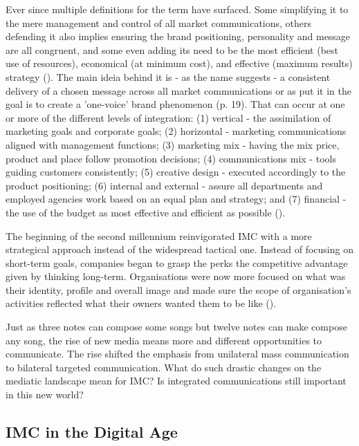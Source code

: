 \documentclass[11pt]{article}
\begin{document}
Ever since multiple definitions for the term have surfaced. Some simplifying it to the mere management and control of all market communications, others defending it also implies ensuring the brand positioning, personality and message are all congruent, and some even adding its need to be the most efficient (best use of resources), economical (at minimum cost), and effective (maximum results) strategy (\cite{smith}). The main ideia behind it is - as the name suggests - a consistent delivery of a chosen message across all market communications or as  \citeauthor{kitchen} put it in \citeyear{kitchen} the goal is to create a 'one-voice' brand phenomenon (p. 19). That can occur at one or more of the different levels of integration: (1) vertical - the assimilation of marketing goals and corporate goals; (2) horizontal - marketing communications aligned with management functions; (3) marketing mix - having the mix price, product and place follow promotion decisions; (4) communications mix - tools guiding customers consistently; (5) creative design - executed accordingly to the product positioning; (6) internal and external - assure all departments and employed agencies work based on an equal plan and strategy; and (7) financial - the use of the budget as most effective and efficient as possible (\cite{smith}). 

The beginning of the second millennium reinvigorated IMC with a more strategical approach instead of the widespread tactical one. Instead of focusing on short-term goals, companies began to grasp the perks the competitive advantage given by thinking long-term. Organisations were now more focused on what was their identity, profile and overall image and made sure the scope of organisation's activities reflected what their owners wanted them to be like (\cite{holm}).

Just as three notes can compose some songs but twelve notes can make compose any song, the rise of new media means more and different opportunities to communicate. The rise shifted the emphasis from unilateral mass communication to bilateral targeted communication. What do such drastic changes on the mediatic landscape mean for IMC? Is integrated communications still important in this new world?
 
 \subsection{IMC in the Digital Age}
 
\end{document}
